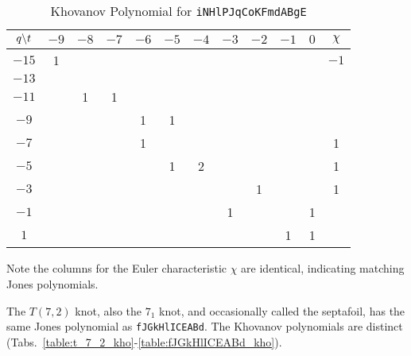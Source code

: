 \documentclass{article}
\theoremstyle{plain}
\begin{document}
        \begin{table}[H]
            \centering
            \begin{tabular}{| c | c | c | c | c | c | c | c | c | c | c | c |}
                \hline
                $q\symbol{92}t$&$-9$&$-8$&$-7$&$-6$&$-5$&$-4$&$-3$&$-2$&$-1$&$0$&$\chi$\\
                \hline
                $-15$&1&&&&&&&&&&$-1$\\
                \hline
                $-13$&&&&&&&&&&&\\
                \hline
                $-11$&&1&1&&&&&&&&\\
                \hline
                $-9$&&&&1&1&&&&&&\\
                \hline
                $-7$&&&&1&&&&&&&1\\
                \hline
                $-5$&&&&&1&2&&&&&1\\
                \hline
                $-3$&&&&&&&&1&&&1\\
                \hline
                $-1$&&&&&&&1&&&1&\\
                \hline
                $1$&&&&&&&&&1&1&\\
                \hline
            \end{tabular}
            \caption{Khovanov Polynomial for \texttt{iNHlPJqCoKFmdABgE}}
            \label{table:iNHlPJqCoKFmdABgE_kho}
        \end{table}
        Note the columns for the Euler characteristic $\chi$ are identical,
        indicating matching Jones polynomials.
        \par\hfill\par
        The $T(7,2)$ knot, also the $7_{1}$ knot, and occasionally called the
        septafoil, has the same Jones polynomial as \texttt{fJGkHlICEABd}. The
        Khovanov polynomials are distinct
        (Tabs.~\ref{table:t_7_2_kho}-\ref{table:fJGkHlICEABd_kho}).
\end{document}

